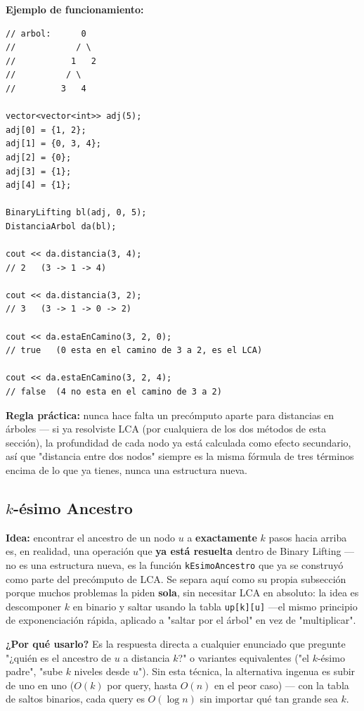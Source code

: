 \documentclass[10pt,a4paper,twocolumn]{article}
\begin{document}
\textbf{Ejemplo de funcionamiento:}

\begin{lstlisting}[style=cpp]
// arbol:      0
//            / \
//           1   2
//          / \
//         3   4

vector<vector<int>> adj(5);
adj[0] = {1, 2};
adj[1] = {0, 3, 4};
adj[2] = {0};
adj[3] = {1};
adj[4] = {1};

BinaryLifting bl(adj, 0, 5);
DistanciaArbol da(bl);

cout << da.distancia(3, 4);
// 2   (3 -> 1 -> 4)

cout << da.distancia(3, 2);
// 3   (3 -> 1 -> 0 -> 2)

cout << da.estaEnCamino(3, 2, 0);
// true   (0 esta en el camino de 3 a 2, es el LCA)

cout << da.estaEnCamino(3, 2, 4);
// false  (4 no esta en el camino de 3 a 2)
\end{lstlisting}

\textbf{Regla práctica:} nunca hace falta un precómputo aparte para
distancias en árboles — si ya resolviste LCA (por cualquiera de los
dos métodos de esta sección), la profundidad de cada nodo ya está
calculada como efecto secundario, así que "distancia entre dos nodos"
siempre es la misma fórmula de tres términos encima de lo que ya
tienes, nunca una estructura nueva.
 

\subsection{\texorpdfstring{$k$}{k}-ésimo Ancestro}

\textbf{Idea:} encontrar el ancestro de un nodo $u$ a
\textbf{exactamente} $k$ pasos hacia arriba es, en realidad, una
operación que \textbf{ya está resuelta} dentro de Binary Lifting
—no es una estructura nueva, es la función \texttt{kEsimoAncestro}
que ya se construyó como parte del precómputo de LCA. Se separa aquí
como su propia subsección porque muchos problemas la piden
\textbf{sola}, sin necesitar LCA en absoluto: la idea es descomponer
$k$ en binario y saltar usando la tabla \texttt{up[k][u]} —el mismo
principio de exponenciación rápida, aplicado a "saltar por el árbol"
en vez de "multiplicar".

\textbf{¿Por qué usarlo?} Es la respuesta directa a cualquier
enunciado que pregunte "¿quién es el ancestro de $u$ a distancia
$k$?" o variantes equivalentes ("el $k$-ésimo padre", "sube $k$
niveles desde $u$"). Sin esta técnica, la alternativa ingenua es
subir de uno en uno ($O(k)$ por query, hasta $O(n)$ en el peor caso)
— con la tabla de saltos binarios, cada query es $O(\log n)$ sin
importar qué tan grande sea $k$.
\end{document}
